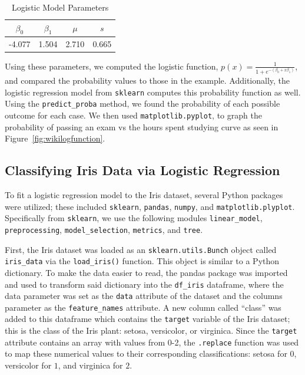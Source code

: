 \documentclass[journal]{IEEEtran}
\begin{document}
\begin{table}[h!]
\centering
\begin{tabular}{c c c c}
    $\beta_0$ & $\beta_1$ &	$\mu$ & \(s\) \\
    \hline
    -4.077	& 1.504	& 2.710 & 0.665 \\
\end{tabular}
\caption{Logistic Model Parameters}
\end{table}

Using these parameters, we computed the logistic function, \( p(x)=\frac{1}{1+e^{-(\beta_0+x\beta_1)}}\), and compared the probability values to those in the example. Additionally, the logistic regression model from \lstinline{sklearn} computes this probability function as well. Using the \lstinline{predict_proba} method, we found the probability of each possible outcome for each case. We then used \lstinline{matplotlib.pyplot}, to graph the probability of passing an exam vs the hours spent studying curve as seen in Figure~\ref{fig:wikilogfunction}. 

\subsection{Classifying Iris Data via Logistic Regression}

To fit a logistic regression model to the Iris dataset, several Python packages were utilized; these included \lstinline{sklearn}, \lstinline{pandas}, \lstinline{numpy}, and \lstinline{matplotlib.plyplot}. Specifically from \lstinline{sklearn}, we use the following modules \lstinline{linear_model}, \lstinline{preprocessing}, \lstinline{model_selection}, \lstinline{metrics}, and \lstinline{tree}. 

First, the Iris dataset was loaded as an \lstinline{sklearn.utils.Bunch} object called \lstinline{iris_data} via the \lstinline{load_iris()} function. This object is similar to a Python dictionary. To make the data easier to read, the pandas package was imported and used to transform said dictionary into the \lstinline{df_iris} dataframe, where the data parameter was set as the \lstinline{data} attribute of the dataset and the columns parameter as the \lstinline{feature_names} attribute. A new column called “class” was added to this dataframe which contains the \lstinline{target} variable of the Iris dataset; this is the class of the Iris plant: setosa, versicolor, or virginica. Since the \lstinline{target} attribute contains an array with values from 0-2, the \lstinline{.replace} function was used to map these numerical values to their corresponding classifications: setosa for \(0\), versicolor for \(1\), and virginica for \(2\).
\end{document}
